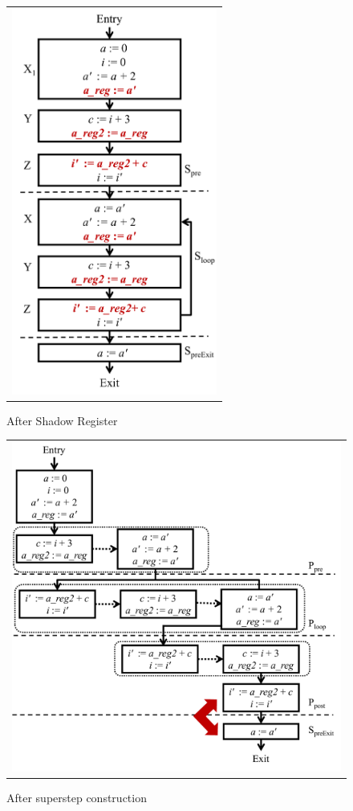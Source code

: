 \begin{figure}[t!]
\begin{center}
\begin{tabular}{c}
\includegraphics[height=5in]{fig-proposal/algorithm-after-shadow-register}
\end{tabular}
\end{center}
\caption{After Shadow Register}
\label{fig:algo3-1}
\end{figure}

\begin{figure}[t!]
\begin{center}
\begin{tabular}{c}
\includegraphics[width=5.5in]{fig-proposal/algorithm-after-superstep-construction}
\end{tabular}
\end{center}
\caption{After superstep construction}
\label{fig:algo3-2}
\end{figure}

